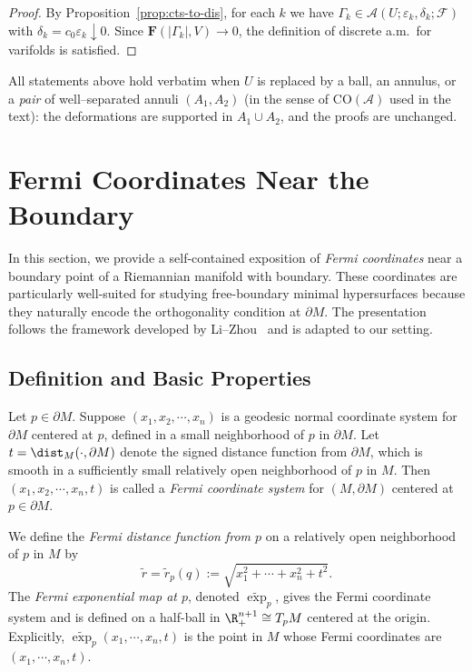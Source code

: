 \begin{proof}
By Proposition~\ref{prop:cts-to-dis}, for each $k$ we have
$\Gamma_k\in \mathscr{A}(U;\varepsilon_k,\delta_k;\mathcal F)$ with
$\delta_k=c_0\varepsilon_k\downarrow 0$. Since $\mathbf F(|\Gamma_k|,V)\to 0$,
the definition of discrete a.m.\ for varifolds is satisfied.
\end{proof}

\begin{remark}
All statements above hold verbatim when $U$ is replaced by a ball, an annulus, or a \emph{pair}
of well–separated annuli $(A_1,A_2)$ (in the sense of $\mathrm{CO}(\mathcal A)$ used in the text):
the deformations are supported in $A_1\cup A_2$, and the proofs are unchanged.
\end{remark}

\section{Fermi Coordinates Near the Boundary}\label{sec:fermi-coordinates}

In this section, we provide a self-contained exposition of \emph{Fermi coordinates} near a boundary
point of a Riemannian manifold with boundary. These coordinates are particularly well-suited for
studying free-boundary minimal hypersurfaces because they naturally encode the orthogonality
condition at $\partial M$. The presentation follows the framework developed by Li--Zhou~\cite{LZ17}
and is adapted to our setting.

\subsection{Definition and Basic Properties}

\begin{definition}\label{def:fermi-coordinates}
Let $p \in \partial M$. Suppose $(x_1,x_2,\cdots,x_n)$ is a geodesic normal coordinate system for
$\partial M$ centered at $p$, defined in a small neighborhood of $p$ in $\partial M$. Let
$t=\dist_M(\cdot,\partial M)$ denote the signed distance function from $\partial M$, which is
smooth in a sufficiently small relatively open neighborhood of $p$ in $M$. Then
$(x_1,x_2,\cdots,x_n,t)$ is called a \emph{Fermi coordinate system} for $(M,\partial M)$ centered
at $p \in \partial M$.

We define the \emph{Fermi distance function from $p$} on a relatively open neighborhood of $p$ in
$M$ by
\begin{equation}\label{eq:fermi-distance}
\tilde r=\tilde r_p(q):=\sqrt{x_1^2+\cdots+x_n^2+t^2}.
\end{equation}
The \emph{Fermi exponential map at $p$}, denoted $\tilde{\exp}_p$, gives the Fermi coordinate
system and is defined on a half-ball in $\R^{n+1}_+ \cong T_pM$ centered at the origin. Explicitly,
$\tilde{\exp}_p(x_1,\cdots,x_n,t)$ is the point in $M$ whose Fermi coordinates are
$(x_1,\cdots,x_n,t)$.
\end{definition}

